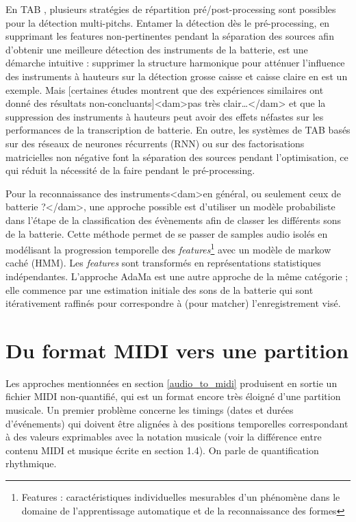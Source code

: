 En TAB \cite{Review_ADT}, plusieurs stratégies de répartition
pré/post-processing sont possibles pour la détection multi-pitchs. Entamer la
détection dès le pré-processing, en supprimant les features non-pertinentes
pendant la séparation des sources afin d’obtenir une meilleure détection des
instruments de la batterie, est une démarche intuitive : supprimer la structure
harmonique pour atténuer l’influence des instruments à hauteurs  sur la détection grosse caisse et caisse claire en est un
exemple. 
Mais [certaines études montrent que des expériences similaires ont donné des
résultats non-concluants]<dam>pas très clair…</dam> et que la suppression des
instruments à hauteurs peut avoir des effets néfastes sur les performances de
la transcription de batterie. En outre, les systèmes de TAB basés sur des
réseaux de neurones récurrents (RNN) ou sur des factorisations matricielles non
négative font la séparation des sources pendant l’optimisation, ce qui réduit
la nécessité de la faire pendant le pré-processing.

Pour la reconnaissance des instruments<dam>en général, ou seulement ceux de
batterie ?</dam>, une approche possible \cite{Eronen} est d’utiliser un modèle
probabiliste dans l’étape de la classification des évènements
 afin de
classer les différents sons de la batterie. Cette méthode permet de se
passer de samples audio isolés en modélisant la progression temporelle des
\textit{features}\footnote{Features : caractéristiques individuelles mesurables
d'un phénomène dans le domaine de l'apprentissage automatique et de la
reconnaissance des formes} avec un modèle de markow caché (HMM). Les
\textit{features} sont transformés en représentations statistiques
indépendantes.  L’approche AdaMa \cite{adama_1} est une autre approche
de la même catégorie ; elle commence par une estimation initiale des sons de la
batterie qui sont itérativement raffinés pour correspondre à (pour matcher)
l’enregistrement visé.

\section{Du format MIDI vers une partition}
Les approches mentionnées en section \ref{audio_to_midi} produisent en sortie
un fichier MIDI non-quantifié, qui est un format encore très éloigné d'une
partition musicale. Un premier problème concerne les timings (dates et durées
d'événements) qui doivent être alignées à des positions temporelles
correspondant à des valeurs exprimables avec la notation musicale (voir la
différence entre contenu MIDI et musique écrite en section 1.4). On parle de
quantification rhythmique.

